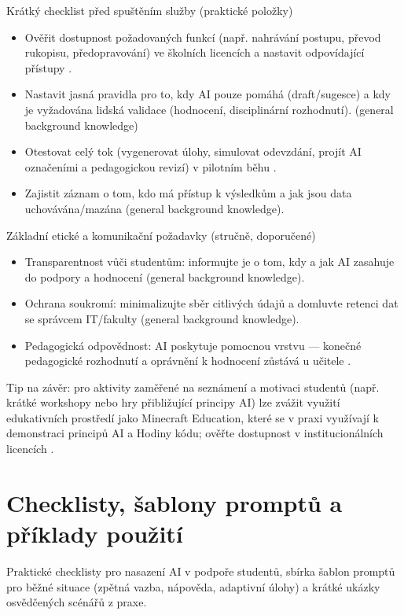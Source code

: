 \documentclass{report}%
\begin{document}
Krátký checklist před spuštěním služby (praktické položky)
\begin{itemize}
  \item Ověřit dostupnost požadovaných funkcí (např. nahrávání postupu, převod rukopisu, předopravování) ve školních licencích a nastavit odpovídající přístupy \cite{kb_ai_101_tipu_pdf_04e4a115_page_8_1}.
  \item Nastavit jasná pravidla pro to, kdy AI pouze pomáhá (draft/sugesce) a kdy je vyžadována lidská validace (hodnocení, disciplinární rozhodnutí). (general background knowledge)
  \item Otestovat celý tok (vygenerovat úlohy, simulovat odevzdání, projít AI označeními a pedagogickou revizí) v pilotním běhu \cite{kb_ai_101_tipu_pdf_04e4a115_page_8_1}.
  \item Zajistit záznam o tom, kdo má přístup k výsledkům a jak jsou data uchovávána/mazána (general background knowledge).
\end{itemize}

Základní etické a komunikační požadavky (stručně, doporučené)
\begin{itemize}
  \item Transparentnost vůči studentům: informujte je o tom, kdy a jak AI zasahuje do podpory a hodnocení (general background knowledge).
  \item Ochrana soukromí: minimalizujte sběr citlivých údajů a domluvte retenci dat se správcem IT/fakulty (general background knowledge).
  \item Pedagogická odpovědnost: AI poskytuje pomocnou vrstvu — konečné pedagogické rozhodnutí a oprávnění k hodnocení zůstává u učitele \cite{kb_ai_101_tipu_pdf_04e4a115_page_8_1}.
\end{itemize}

Tip na závěr: pro aktivity zaměřené na seznámení a motivaci studentů (např. krátké workshopy nebo hry přibližující principy AI) lze zvážit využití edukativních prostředí jako Minecraft Education, které se v praxi využívají k demonstraci principů AI a Hodiny kódu; ověřte dostupnost v institucionálních licencích \cite{kb_ai_101_tipu_pdf_04e4a115_page_15_2}.%

%
\section{Checklisty, šablony promptů a příklady použití}%
Praktické checklisty pro nasazení AI v podpoře studentů, sbírka šablon promptů pro běžné situace (zpětná vazba, nápověda, adaptivní úlohy) a krátké ukázky osvědčených scénářů z praxe.%
\end{document}
